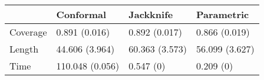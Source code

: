 \begin{tabular}{|l|l|l|l|}
\hline
& Conformal & Jackknife & Parametric \\
\hline
Coverage & 0.891 (0.016) & 0.892 (0.017) & 0.866 (0.019) \\
\hline
Length & 44.606 (3.964) & 60.363 (3.573) & 56.099 (3.627) \\
\hline
Time & 110.048 (0.056) & 0.547 (0) & 0.209 (0) \\
\hline
\end{tabular}
